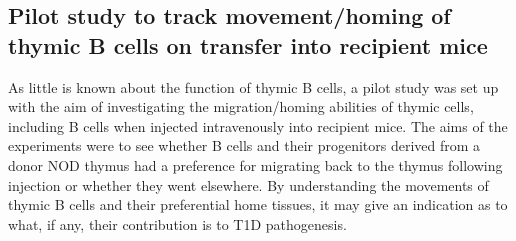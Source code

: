 \subsection{Pilot study to track movement/homing of thymic B cells on transfer into recipient mice}


As little is known about the function of thymic B cells, a pilot study was set up with the aim of investigating the migration/homing abilities of thymic cells, including B cells when injected intravenously into recipient mice.
The aims of the experiments were to see whether B cells and their progenitors derived from a donor NOD thymus had a preference for migrating back to the thymus following injection or whether they went elsewhere.
By understanding the movements of thymic B cells and their preferential home tissues, it may give an indication as to what, if any, their contribution is to T1D pathogenesis.

